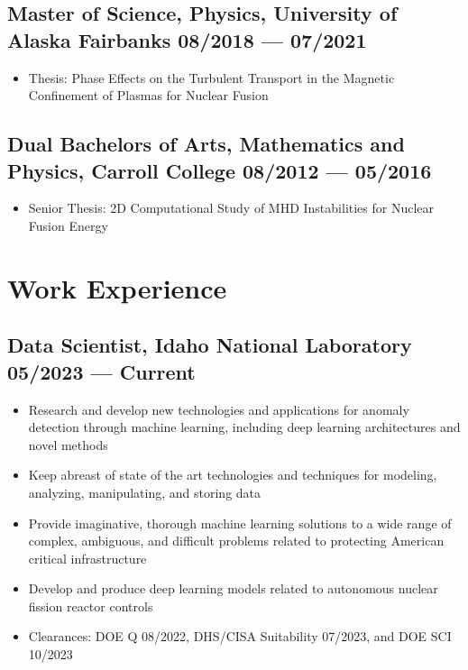 \documentclass[letterpaper,11pt]{article}
\begin{document}
\subsection*{{\color{cvblue}Master of Science, Physics,} {University of Alaska Fairbanks} \hfill 08/2018 --- 07/2021} %

\begin{itemize}
    \setlength{\itemsep}{-.5pt}
\item Thesis: Phase Effects on the Turbulent Transport in the Magnetic Confinement of Plasmas for Nuclear Fusion
\end{itemize}
\subsection*{{\color{cvblue}Dual Bachelors of Arts, Mathematics and Physics,} {Carroll College} \hfill 08/2012 --- 05/2016} %

\begin{itemize}
    \setlength{\itemsep}{-.5pt}
\item Senior Thesis: 2D Computational Study of MHD Instabilities for Nuclear Fusion Energy
\end{itemize}



\section{\color{cvblue}Work Experience } %

\subsection*{{\color{cvblue}Data Scientist, Idaho National Laboratory } \hfill 05/2023 — Current} 
\begin{itemize}
    \setlength{\itemsep}{-.5pt}
\item  Research and develop new technologies and applications for anomaly detection through machine learning, including deep learning architectures and novel methods
\item  Keep abreast of state of the art technologies and techniques for modeling, analyzing, manipulating, and storing data
\item  Provide imaginative, thorough machine learning solutions to a wide range of complex, ambiguous, and difficult problems related to protecting American critical infrastructure
\item  Develop and produce deep learning models related to autonomous nuclear fission reactor controls
\item  Clearances: DOE Q 08/2022, DHS/CISA Suitability 07/2023, and DOE SCI 10/2023
\end{itemize}
\end{document}
